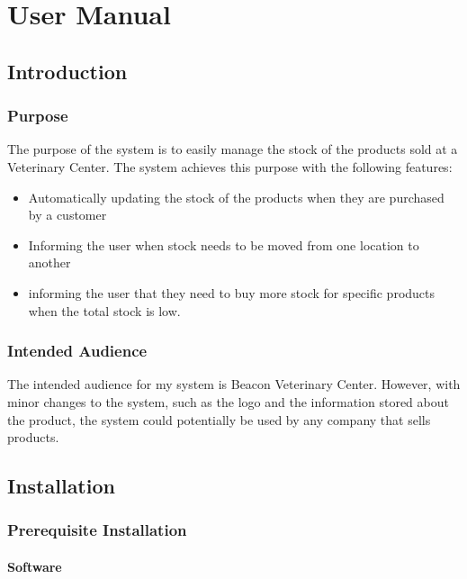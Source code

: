 
\chapter{User Manual}

\startcontents[chapters]

\section{Introduction}

\subsection{Purpose}

The purpose of the system is to easily manage the stock of the products sold at a Veterinary Center. The system achieves this purpose with the following features:

\begin{itemize}
\item{Automatically updating the stock of the products when they are purchased by a customer}
\item{Informing the user when stock needs to be moved from one location to another}
\item{informing the user that they need to buy more stock for specific products when the total stock is low.}
\end{itemize}

\subsection{Intended Audience}

The intended audience for my system is Beacon Veterinary Center. However, with minor changes to the system, such as the logo and the information stored about the product, the system could potentially be used by any company that sells products. 

\section{Installation}

\subsection{Prerequisite Installation}
\subsubsection{Software}

